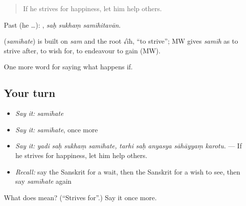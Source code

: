 \begin{quote}
If he strives for happiness, let him help others.
\end{quote}

Past (he …):   , \emph{saḥ sukhaṃ samīhitavān}.

\begin{cousinweb}
\textbf{} (\emph{samīhate}) is built on \emph{sam} and the root √īh, \textquotedblleft{}to strive\textquotedblright{}; MW gives \emph{samīh} as to strive after, to wish for, to endeavour to gain (MW).
\end{cousinweb}

\begin{grammarlens}[title={What you've built}]
One more word for saying what happens if.
\end{grammarlens}

\subsection*{Your turn}
\begin{itemize}
\raggedright
  \item \emph{Say it:} \emph{samīhate}
  \item \emph{Say it:} \emph{samīhate}, once more
  \item \emph{Say it:} \emph{yadi saḥ sukhaṃ samīhate, tarhi saḥ anyasya sāhāyyaṃ karotu.} — If he strives for happiness, let him help others.
  \item \emph{Recall:} say the Sanskrit for a wait, then the Sanskrit for a wish to see, then say \emph{samīhate} again
\end{itemize}

\begin{tcolorbox}[breakable,colback=teal!4,colframe=teal!35!black,title={Before you move on}]
What does  mean? (\textquotedblleft{}Strives for\textquotedblright{}.) Say it once more.
\end{tcolorbox}
